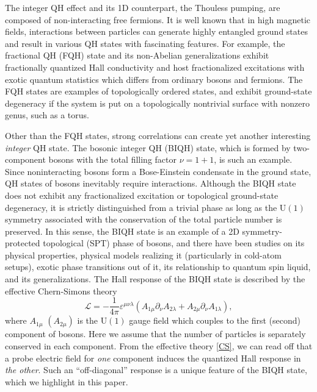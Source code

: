 \documentclass[aps,prb,twocolumn,superscriptaddress,showpacs,floatfix]{revtex4-1}
\begin{document}
The integer QH effect and its 1D counterpart, the Thouless pumping, are composed of non-interacting free fermions. 
It is well known that in high magnetic fields, interactions between particles can generate highly entangled ground states and result in 
various QH states with fascinating features. 
For example, the fractional QH (FQH) state\cite{Tsui, Laughlin} and its non-Abelian generalizations\cite{MooreRead, ReadRezayi, NASS} exhibit fractionally quantized Hall conductivity and host fractionalized excitations with exotic quantum statistics which differs from ordinary bosons and fermions. The FQH states are examples of 
topologically ordered states,\cite{WenIntJMod} and exhibit ground-state degeneracy if the system is put on a topologically nontrivial surface with nonzero genus, such as a torus.\cite{NiuWen}

Other than the FQH states, strong correlations can create yet another interesting \textit{integer} QH state. 
The bosonic integer QH (BIQH) state,\cite{SenthilLevin} which is formed by two-component bosons with the total filling factor $\nu=1+1$, is such an example. Since noninteracting bosons form a Bose-Einstein condensate in the ground state, QH states of bosons inevitably require interactions. Although the BIQH state does not exhibit any fractionalized excitation or topological ground-state degeneracy, it is strictly distinguished from a trivial phase as long as the U$(1)$ symmetry associated with the conservation of the total particle number is preserved.\cite{LuVishwanath} 
In this sense, the BIQH state is an example of a 2D symmetry-protected topological (SPT) phase\cite{GuWen, Chen, SPTbook} of bosons, and there have been studies on its physical properties,\cite{Grover,LiuWen,YeWen,Geraedts,LiuMei} physical models realizing it (particularly in cold-atom setups),\cite{FurukawaUeda, WuJain, RegnaultSenthil, Grass, Sterdyniak, He, Fuji, ZengBIQH,HeGrusdt,Moller1,Moller2} exotic phase transitions out of it,\cite{Grover,LuLee,Fuji} its relationship to quantum spin liquid,\cite{Barkeshli,He2, He3} and its generalizations.\cite{LiuWen,YeWen,Lapa} 
The Hall response of the BIQH state is described by the effective Chern-Simons theory\cite{SenthilLevin,LuVishwanath} 
\begin{equation}
\mathcal{L}=-\frac{1}{4\pi}\varepsilon^{\mu\nu\lambda}(A_{1\mu}\partial_\nu A_{2\lambda}+A_{2\mu}\partial_\nu A_{1\lambda}),
\label{CS}
\end{equation}
where $A_{1\mu}$ $(A_{2\mu})$ is the U$(1)$ gauge field which couples to the first (second) component of bosons. Here we assume that the number of particles is separately conserved in each component. 
From the effective theory \eqref{CS}, we can read off that a probe electric field for \textit{one} component induces the quantized Hall response in \textit{the other}. Such an ``off-diagonal'' response is a unique feature of the BIQH state, which we highlight in this paper. 
\end{document}
